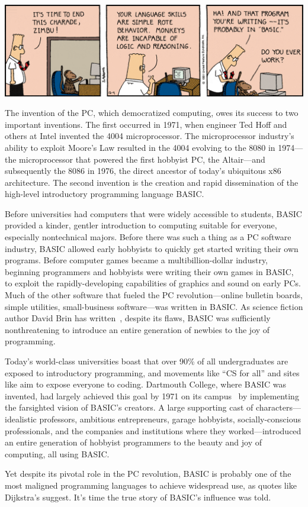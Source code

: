 

\noindent\includegraphics[width=\textwidth]{figs/dilbert-1991-12-04.png}

The invention of the PC, which democratized computing, owes its success
to two important inventions.  
The first occurred in 1971, when engineer Ted Hoff and others
at Intel invented the 4004 microprocessor.
The microprocessor industry's ability to exploit Moore's Law resulted in
the 4004 evolving to the 8080 in 1974---the microprocessor that powered
the first hobbyist PC, the Altair---and subsequently the 8086 in 1976,
the direct  ancestor of today's ubiquitous x86
architecture.
The second invention is the creation and rapid dissemination of the
high-level introductory programming language BASIC.

Before universities had computers that were widely accessible to students, BASIC
provided a kinder, gentler introduction to computing suitable for
everyone, especially nontechnical majors.
Before there was such a thing as a PC software industry, 
BASIC allowed early hobbyists to quickly get started writing their own
programs.
Before computer games became a multibillion-dollar industry, beginning
programmers and hobbyists were writing their own games in BASIC, to
exploit the rapidly-developing capabilities of graphics and sound on
early PCs. 
Much of the other software that fueled the PC revolution---online
bulletin boards, simple utilities, small-business software---was written
in BASIC. 
As science fiction author David Brin has written~\cite{why_johnny_cant_code},
despite its flaws, BASIC
was sufficiently nonthreatening to introduce an entire generation of
newbies to the joy of programming.

Today's world-class universities boast that over 90\% of all
undergraduates are exposed to introductory programming, and movements
like ``CS for all'' and sites like  aim to expose everyone
to coding.
Dartmouth College, where BASIC was invented, had largely
achieved this goal by 1971 on its campus~\cite{man_and_computer} by implementing the
farsighted vision of BASIC's creators.
A large supporting cast of characters---idealistic professors,
ambitious entrepreneurs, garage hobbyists, socially-conscious
professionals, and the companies and institutions where they
worked---introduced  an entire generation
of hobbyist programmers to the beauty and joy of computing, all using BASIC.

Yet despite its pivotal role in the PC revolution, BASIC is probably
one of the most maligned programming languages to achieve widespread
use, as quotes like Dijkstra's suggest.
It's time the true story of BASIC's influence was told.

